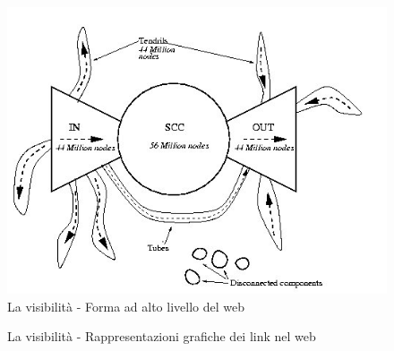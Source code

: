 				\begin{figure}
					\centering
					\includegraphics[scale=0.6]{images/LaVisibilita-FormaWeb}
					\caption{La visibilità - Forma ad alto livello del web}
				\end{figure}								
				
				\begin{figure} [h]
					 \quad
					\caption{La visibilità - Rappresentazioni grafiche dei link nel web}
					\label{fig:LaVisibilita-FormaWeb}
				\end{figure}
			
